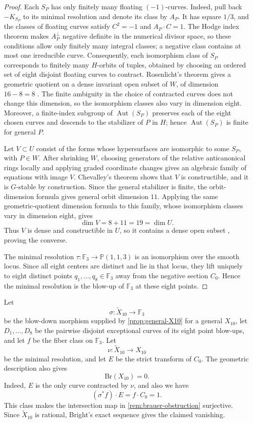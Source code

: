 \documentclass[11pt]{article}
\theoremstyle{plain}
\theoremstyle{definition}
\theoremstyle{remark}
\newcommand{\Pp}{\mathbb P}
\newcommand{\F}{\mathbb F}
\newcommand{\Br}{\mathrm{Br}}
\begin{document}
\begin{proof}
Each \(S_P\) has only finitely many floating \((-1)\)-curves. Indeed,
pull back \(-K_{S_P}\) to its minimal resolution and denote its class by
\(A_P\). It has square \(1/3\), and the classes of floating curves satisfy
\(C^2=-1\) and \(A_P\cdot C=1\). The Hodge index theorem
\cite[Chapter~V, Theorem~1.9]{Hartshorne1977} makes
\(A_P^\perp\) negative definite in the numerical divisor space, so these conditions allow only finitely
many integral classes; a negative class contains at most one irreducible
curve. Consequently, each isomorphism class of \(S_P\) corresponds to
finitely many \(H\)-orbits of tuples, obtained by choosing an ordered set
of eight disjoint floating curves to contract. Rosenlicht's theorem gives
a geometric quotient on a dense invariant open subset of \(W\), of
dimension \(16-8=8\) \cite[Section~1.2]{Brion2010}.
The finite ambiguity in the choice of contracted curves does not change
this dimension, so the isomorphism classes also vary in dimension eight.
Moreover, a finite-index subgroup of
\(\operatorname{Aut}(S_P)\) preserves each of the eight chosen curves and
descends to the stabilizer of \(P\) in \(H\); hence
\(\operatorname{Aut}(S_P)\) is finite for general \(P\).

Let \(V\subset U\) consist of the forms whose hypersurfaces are isomorphic
to some \(S_P\), with \(P\in W\). After shrinking \(W\), choosing
generators of the relative anticanonical rings locally and applying graded
coordinate changes gives an algebraic family of equations with image
\(V\). Chevalley's theorem \cite[Tag~054K]{StacksProject} shows that
\(V\) is constructible, and it is \(G\)-stable by construction.
Since the general stabilizer is finite, the orbit-dimension formula
\cite[Proposition~1.11]{Brion2010} gives general orbit dimension \(11\).
Applying the same geometric-quotient dimension formula to this family,
whose isomorphism classes vary in dimension eight, gives
\[
\dim V=8+11=19=\dim U.
\]
Thus \(V\) is dense and constructible in \(U\), so it contains a dense
open subset \cite[Tag~005K]{StacksProject}, proving the converse.

The minimal resolution
\(\tau:\F_3\to\Pp(1,1,3)\) is an isomorphism over the smooth locus. Since all
eight centers are distinct and lie in that locus, they lift uniquely to
eight distinct points
\(q_1,\dots,q_8\in\F_3\) away from the negative section \(C_0\). Hence the
minimal resolution is the blow-up of \(\F_3\) at these eight points.
\end{proof}

Let
\[
\sigma:\widetilde X_{10}\longrightarrow \F_3
\]
be the blow-down morphism supplied by
\cref{prop:general-X10} for a general \(X_{10}\), let
\(D_1,\dots,D_8\) be the pairwise disjoint exceptional curves of its eight
point blow-ups, and
let \(f\) be the fiber class on \(\F_3\). Let
\[
\nu:\widetilde X_{10}\longrightarrow X_{10}
\]
be the minimal resolution, and let \(E\) be the strict transform of \(C_0\).
The geometric description also gives
\[
\Br(X_{10})=0.
\]
Indeed, \(E\) is the only curve contracted by \(\nu\), and also we have
\[
(\sigma^*f)\cdot E=f\cdot C_0=1.
\]
This class makes the intersection map in \cref{rem:brauer-obstruction} surjective.
Since \(\widetilde X_{10}\) is rational, Bright's exact sequence gives the
claimed vanishing.
\end{document}

